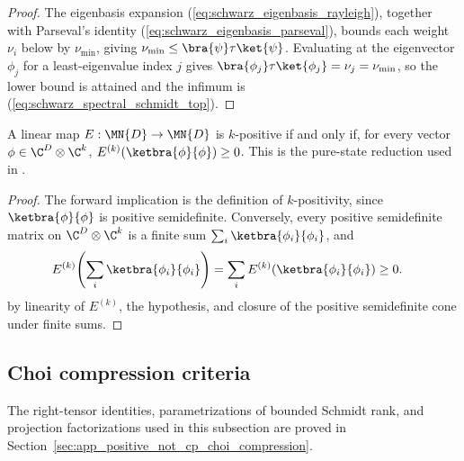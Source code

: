 \begin{proof}
    \leanok
    The eigenbasis expansion (\ref{eq:schwarz_eigenbasis_rayleigh}), together
    with Parseval's identity (\ref{eq:schwarz_eigenbasis_parseval}), bounds
    each weight $\nu_i$ below by $\nu_{\min}$, giving
    $\nu_{\min}\le\bra{\psi}\tau\ket{\psi}$. Evaluating at the eigenvector
    $\phi_j$ for a least-eigenvalue index $j$ gives
    $\bra{\phi_j}\tau\ket{\phi_j}=\nu_j=\nu_{\min}$, so the lower bound is
    attained and the infimum is (\ref{eq:schwarz_spectral_schmidt_top}).
\end{proof}

\begin{theorem}\label{thm:k_positive_rank_one_test}
    \leanok
    A linear map $E:\MN{D}\to\MN{D}$ is $k$-positive if and only if, for
    every vector $\phi\in\C^D\otimes\C^k$,
    $E^{(k)}(\ketbra{\phi}{\phi})\ge0$.
    This is the pure-state reduction used in
    \cite[Chapter~3, Proposition~3.1]{Wolf2012Quantum}.
\end{theorem}

\begin{proof}
    \leanok
    The forward implication is the definition of $k$-positivity, since
    $\ketbra{\phi}{\phi}$ is positive semidefinite. Conversely, every
    positive semidefinite matrix on $\C^D\otimes\C^k$ is a finite sum
    $\sum_i\ketbra{\phi_i}{\phi_i}$, and
    \begin{align}
        E^{(k)}\!\left(\sum_i\ketbra{\phi_i}{\phi_i}\right)
         & =\sum_iE^{(k)}(\ketbra{\phi_i}{\phi_i})\ge0.
        \notag
    \end{align}
    by linearity of $E^{(k)}$, the hypothesis, and closure of the positive
    semidefinite cone under finite sums.
\end{proof}

\subsection{Choi compression criteria}

The right-tensor identities, parametrizations of bounded Schmidt rank, and
projection factorizations used in this subsection are proved in
Section~\ref{sec:app_positive_not_cp_choi_compression}.

